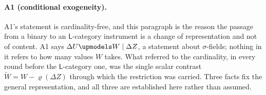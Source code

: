 \paragraph{A1 (conditional exogeneity).}

A1's statement is cardinality-free, and this paragraph is the reason the passage from a binary to
an $\mathsf L$-category instrument is a change of representation and not of content. A1 says
$\Delta U\upmodels W\mid\Delta Z$, a statement about $\sigma$-fields; nothing in it refers to how many
values $W$ takes. What referred to the cardinality, in every round before the $\mathsf L$-category one,
was the single scalar contrast $\widetilde W=W-\varrho(\Delta Z)$ through which the restriction was
carried. Three facts fix the general representation, and all three are established here rather than
assumed.

